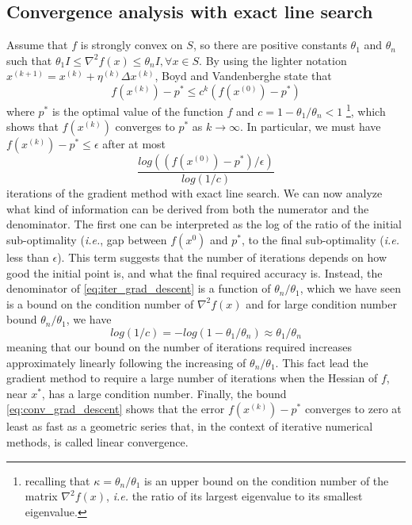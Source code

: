 \subsection{Convergence analysis with exact line search}\label{subsec:smd_convergence}
Assume that $f$ is strongly convex on $S$, so there are positive constants $\theta_1$ and $\theta_n$ such that $\theta_1I \leq \nabla^{2}f(x) \leq \theta_nI, \forall x \in S$. By using the lighter notation $x^{(k+1)} = x^{(k)} + \eta^{(k)}\Delta x^{(k)}$, Boyd and Vandenberghe \cite{boyd2004convex} state that
\begin{equation}
    f(x^{(k)}) - p^{*} \leq c^{k}(f(x^{(0)}) - p^{*})
    \label{eq:conv_grad_descent}
\end{equation}
where $p^*$ is the optimal value of the function $f$ and $c = 1 - \theta_1/\theta_n < 1$ \footnote{recalling that $\kappa = \theta_n/\theta_1 $ is an upper bound on the condition number of the matrix $\nabla^2f(x)$, \textit{i.e.} the ratio of its largest eigenvalue to its smallest eigenvalue.}, which shows that $f(x^{(k)})$ converges to $p^*$ as $k \rightarrow \infty$. In particular, we must have $f(x^{(k)}) - p^* \leq \epsilon$ after at most 
\begin{equation}
    \frac{log((f(x^{(0)})-p^*)/\epsilon)}{log(1/c)}
    \label{eq:iter_grad_descent}
\end{equation}
iterations of the gradient method with exact line search. We can now analyze what kind of information can be derived from both the numerator and the denominator. The first one can be interpreted as the log of the ratio of the initial sub-optimality (\textit{i.e.}, gap between $f(x^{0})$ and $p^*$, to the final sub-optimality (\textit{i.e.} less than $\epsilon$). This term
suggests that the number of iterations depends on how good the initial point is, and what the final required accuracy is. Instead, the denominator of \eqref{eq:iter_grad_descent} is a function of $\theta_n/\theta_1$, which we have seen is a bound on the condition number of $\nabla^2 f(x)$ and for large condition number bound $\theta_n/\theta_1$, we have 
\begin{equation}
    log(1/c) = -log(1-\theta_1/\theta_n) \approx \theta_1/\theta_n
\end{equation}
meaning that our bound on the number of iterations required increases approximately linearly following the increasing of $\theta_n/\theta_1$. This fact lead the gradient method to require a large number of iterations when the Hessian of $f$, near $x^*$, has a large condition number. Finally, the bound \eqref{eq:conv_grad_descent} shows that the error $f(x^{(k)}) - p^{*}$ converges to zero at least as fast as a geometric series that, in the context of iterative numerical methods, is called linear convergence.


